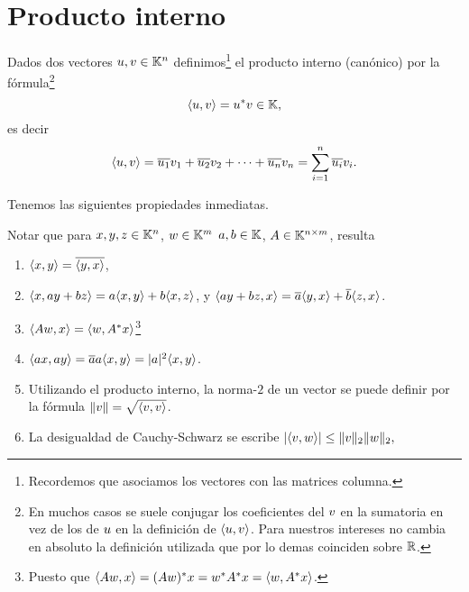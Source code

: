 \section{Producto interno}
\tccdefi
\begin{definicion}
Dados dos vectores $\ub, \vb \in \K^n$ definimos\footnote{Recordemos que asociamos los vectores con las matrices columna.} el producto interno (canónico) por la fórmula\footnote{En muchos casos se suele conjugar los coeficientes del $\vb$ en la sumatoria en vez de los de $\ub$  en la definición de $\langle \ub,\vb\rangle$. Para nuestros intereses no cambia en absoluto la definición utilizada que por lo demas coinciden sobre $\mathbb R$.} $$
\langle \ub, \vb \rangle = \ub^*\vb\in \K,
$$
es decir
$$
\langle \ub, \vb \rangle=\overline{u_1} v_1 + \overline{u_2} v_2 + \dots + \overline{u_n} v_n = \sum_{i=1}^{n} \overline{u_i}v_i.
$$
\end{definicion}
\etcc
Tenemos las siguientes propiedades inmediatas.

\tcc
\begin{observacion}
\label{obs:interno}
Notar que para $\xb,\yb,\zb \in \K^n$, $\wb\in \K^m$ $a,b \in \mathbb K$,  $\Ab\in \K^{n \times m}$, resulta

\begin{enumerate}
\item   $\langle \xb, \yb \rangle= \overline{\langle \yb, \xb \rangle}$,
\item   $\langle \xb, a\yb + b\zb \rangle = a \langle \xb, \yb \rangle + b \langle \xb, \zb \rangle$,  y $\langle a\yb + b\zb,\xb \rangle = \overline{a} \langle \yb, \xb \rangle + \overline{b} \langle \zb, \xb \rangle$.
\item  $\langle \Ab\wb, \xb \rangle = \langle  \wb,\Ab^* \xb \rangle$\footnote{Puesto que $\langle \Ab\wb, \xb \rangle = (\Ab\wb)^*\xb=\wb^*\Ab^*\xb= \langle  \wb,\Ab^* \xb \rangle$.}
  \item $\langle a\xb, a\yb \rangle = \overline{a}a \langle \xb, \yb \rangle=|a|^2 \langle \xb, \yb \rangle$.
\item  Utilizando el producto interno, la norma-$2$ de un vector se puede definir por la fórmula $\|\vb\| = \sqrt{\langle \vb, \vb\rangle}$.
\item La desigualdad de Cauchy-Schwarz se escribe
$|\langle \vb,\wb\rangle|\le \|\vb\|_2\|\wb\|_2,$
 \end{enumerate}
\end{observacion}
\etcc

